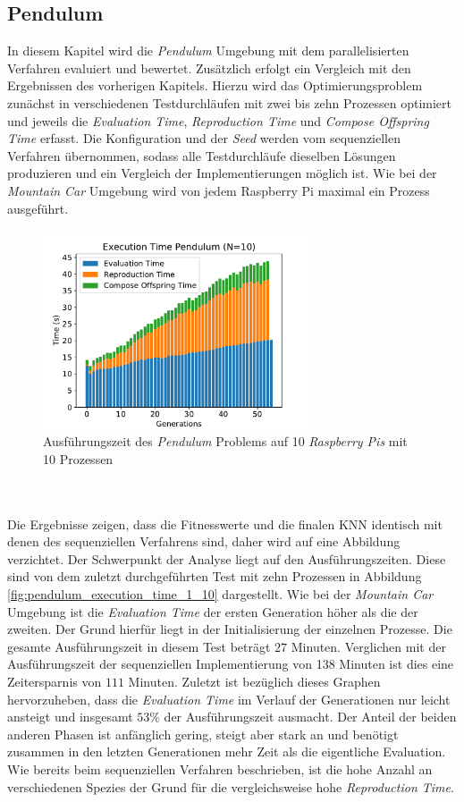 \subsection{Pendulum}
In diesem Kapitel wird die \emph{Pendulum} Umgebung mit dem parallelisierten Verfahren evaluiert und bewertet. Zusätzlich erfolgt ein Vergleich mit den Ergebnissen des vorherigen Kapitels. Hierzu wird das Optimierungsproblem zunächst in verschiedenen Testdurchläufen mit zwei bis zehn Prozessen optimiert und jeweils die \emph{Evaluation Time}, \emph{Reproduction Time} und \emph{Compose Offspring Time} erfasst. Die Konfiguration und der \emph{Seed} werden vom sequenziellen Verfahren übernommen, sodass alle Testdurchläufe dieselben Lösungen produzieren und ein Vergleich der Implementierungen möglich ist. Wie bei der \emph{Mountain Car} Umgebung wird von jedem Raspberry Pi maximal ein Prozess ausgeführt. 
\begin{figure}[!htb]
	\centering
	\includegraphics[width=0.7\textwidth]{./img/pendulum_analysis/pendulum_time_1_10core_10pi.pdf} 
	\caption{Ausführungszeit des \emph{Pendulum} Problems auf 10 \emph{Raspberry Pis} mit 10 Prozessen}
	\label{fig:pendulum_time_10cores_10pi}
\end{figure}
\\\\
Die Ergebnisse zeigen, dass die Fitnesswerte und die finalen \ac{KNN} identisch mit denen des sequenziellen Verfahrens sind, daher wird auf eine Abbildung verzichtet. Der Schwerpunkt der Analyse liegt auf den Ausführungszeiten. Diese sind von dem zuletzt durchgeführten Test mit zehn Prozessen in Abbildung \ref{fig:pendulum_execution_time_1_10} dargestellt. Wie bei der \emph{Mountain Car} Umgebung ist die \emph{Evaluation Time} der ersten Generation höher als die der zweiten. Der Grund hierfür liegt in der Initialisierung der einzelnen Prozesse. Die gesamte Ausführungszeit in diesem Test beträgt $27$ Minuten. Verglichen mit der Ausführungszeit der sequenziellen Implementierung von 138 Minuten ist dies eine Zeitersparnis von $111$ Minuten. Zuletzt ist bezüglich dieses Graphen hervorzuheben, dass die \emph{Evaluation Time} im Verlauf der Generationen nur leicht ansteigt und insgesamt $53\%$ der Ausführungszeit ausmacht. Der Anteil der beiden anderen Phasen ist anfänglich gering, steigt aber stark an und benötigt zusammen in den letzten Generationen mehr Zeit als die eigentliche Evaluation. Wie bereits beim sequenziellen Verfahren beschrieben, ist die hohe Anzahl an verschiedenen Spezies der Grund für die vergleichsweise hohe \emph{Reproduction Time}.
